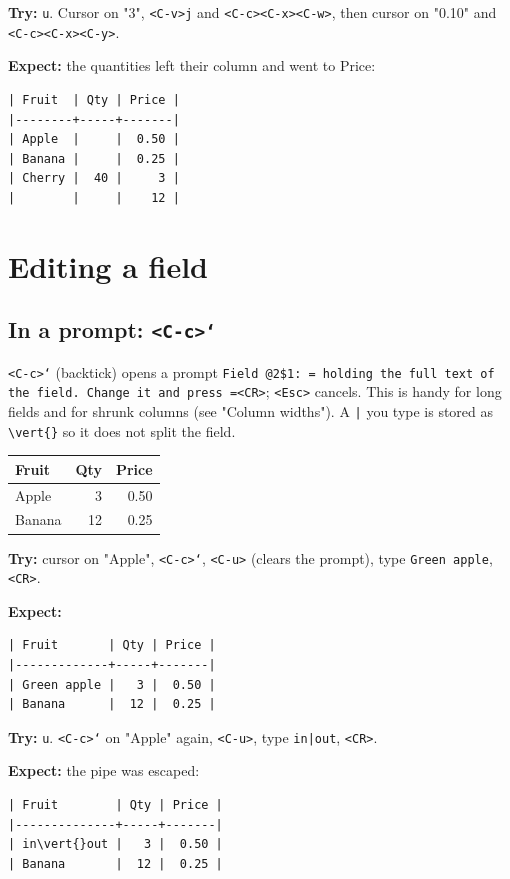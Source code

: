 \textbf{Try:} \texttt{u}. Cursor on "3", \texttt{<C-v>j} and \texttt{<C-c><C-x><C-w>}, then cursor on
"0.10" and \texttt{<C-c><C-x><C-y>}.

\textbf{Expect:} the quantities left their column and went to Price:
\begin{verbatim}
| Fruit  | Qty | Price |
|--------+-----+-------|
| Apple  |     |  0.50 |
| Banana |     |  0.25 |
| Cherry |  40 |     3 |
|        |     |    12 |
\end{verbatim}
\section{Editing a field}
\label{sec:org760f570}
\subsection{In a prompt: \texttt{<C-c>`}}
\label{sec:orgb9b8308}
\texttt{<C-c>`} (backtick) opens a prompt \texttt{Field @2\$1: = holding the full text of
the field. Change it and press =<CR>}; \texttt{<Esc>} cancels. This is handy for
long fields and for shrunk columns (see "Column widths"). A \texttt{|} you type is
stored as \texttt{\textbackslash{}vert\{\}} so it does not split the field.

\begin{table}[htbp]
\label{tab:orgc673174}
\centering
\begin{tabular}{lrr}
Fruit & Qty & Price\\
\hline
Apple & 3 & 0.50\\
Banana & 12 & 0.25\\
\end{tabular}
\end{table}

\textbf{Try:} cursor on "Apple", \texttt{<C-c>`}, \texttt{<C-u>} (clears the prompt), type
\texttt{Green apple}, \texttt{<CR>}.

\textbf{Expect:}
\begin{verbatim}
| Fruit       | Qty | Price |
|-------------+-----+-------|
| Green apple |   3 |  0.50 |
| Banana      |  12 |  0.25 |
\end{verbatim}

\textbf{Try:} \texttt{u}. \texttt{<C-c>`} on "Apple" again, \texttt{<C-u>}, type \texttt{in|out}, \texttt{<CR>}.

\textbf{Expect:} the pipe was escaped:
\begin{verbatim}
| Fruit        | Qty | Price |
|--------------+-----+-------|
| in\vert{}out |   3 |  0.50 |
| Banana       |  12 |  0.25 |
\end{verbatim}
